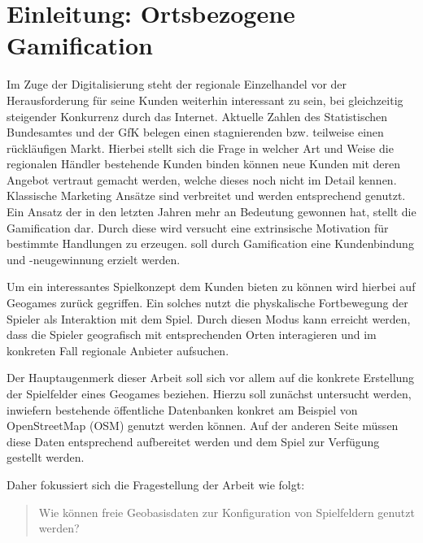 \chapter{Einleitung: Ortsbezogene Gamification}
\label{ch1:Einleitung}

Im Zuge der Digitalisierung steht der regionale Einzelhandel vor der Herausforderung für seine Kunden weiterhin interessant zu sein, bei gleichzeitig steigender Konkurrenz durch das Internet. Aktuelle Zahlen des Statistischen Bundesamtes \citep{DWN.2012} und der GfK belegen einen stagnierenden bzw. teilweise einen rückläufigen Markt.
Hierbei stellt sich die Frage in welcher Art und Weise die regionalen Händler bestehende Kunden binden können neue Kunden mit deren Angebot vertraut gemacht werden, welche dieses noch nicht im Detail kennen.
Klassische Marketing Ansätze sind verbreitet und werden entsprechend genutzt.
Ein Ansatz der in den letzten Jahren mehr an Bedeutung gewonnen hat, stellt die Gamification dar. Durch diese wird versucht eine extrinsische Motivation für bestimmte Handlungen zu erzeugen. soll durch Gamification eine Kundenbindung und -neugewinnung erzielt werden.

Um ein interessantes Spielkonzept dem Kunden bieten zu können wird hierbei auf Geogames zurück gegriffen.
Ein solches nutzt die physkalische Fortbewegung der Spieler als Interaktion mit dem Spiel.
Durch diesen Modus kann erreicht werden, dass die Spieler geografisch mit entsprechenden Orten interagieren und im konkreten Fall regionale Anbieter aufsuchen.

Der Hauptaugenmerk dieser Arbeit soll sich vor allem auf die konkrete Erstellung der Spielfelder eines Geogames beziehen. Hierzu soll zunächst untersucht werden, inwiefern bestehende öffentliche Datenbanken konkret am Beispiel von OpenStreetMap (OSM) genutzt werden können. Auf der anderen Seite müssen diese Daten entsprechend aufbereitet werden und dem Spiel zur Verfügung gestellt werden.

Daher fokussiert sich die Fragestellung der Arbeit wie folgt:
\begin{quote}
\item Wie können freie Geobasisdaten zur Konfiguration von Spielfeldern genutzt werden?
\end{quote}


